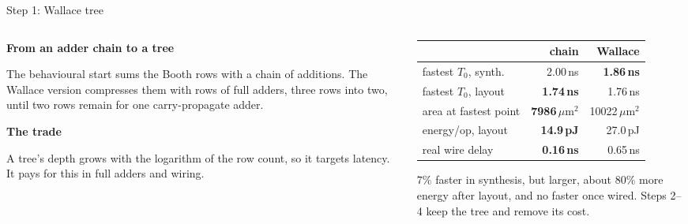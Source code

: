 \documentclass[aspectratio=169,11pt]{beamer}
\newcommand{\umarea}{\ensuremath{\,\mu\mathrm{m}^{2}}}
\begin{document}
\begin{frame}{Step 1: Wallace tree}

\begin{columns}[T]
\begin{column}{0.50\textwidth}
\small
\textbf{From an adder chain to a tree}\par
The behavioural start sums the Booth rows with a chain of additions. The
Wallace version compresses them with rows of full adders, three rows into
two, until two rows remain for one carry-propagate adder.

\vspace{8pt}
\textbf{The trade}\par
A tree's depth grows with the logarithm of the row count, so it targets
latency. It pays for this in full adders and wiring.
\end{column}

\begin{column}{0.46\textwidth}
\scriptsize
\begin{tabular}{@{}lrr@{}}
\toprule
 & chain & Wallace \\
\midrule
fastest $T_0$, synth. & 2.00\,ns & \textbf{1.86\,ns} \\
fastest $T_0$, layout & \textbf{1.74\,ns} & 1.76\,ns \\
area at fastest point & \textbf{7986\umarea} & 10022\umarea \\
energy/op, layout & \textbf{14.9\,pJ} & 27.0\,pJ \\
real wire delay & \textbf{0.16\,ns} & 0.65\,ns \\
\bottomrule
\end{tabular}

\vspace{8pt}
\small
$7\%$ faster in synthesis, but larger, about $80\%$ more energy after layout,
and no faster once wired. Steps 2--4 keep the tree and remove its cost.
\end{column}
\end{columns}

\end{frame}
\end{document}
